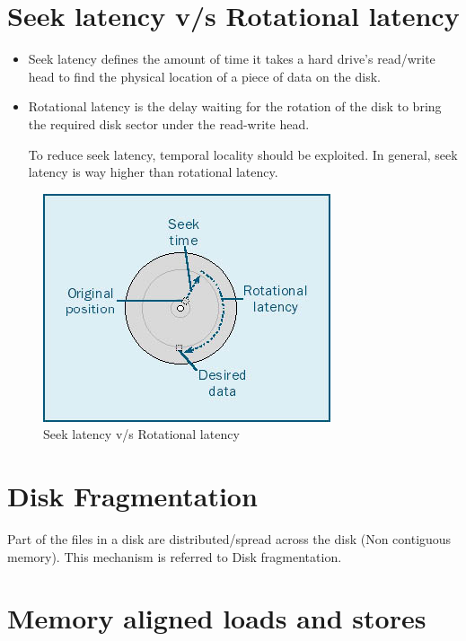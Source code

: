 \documentclass[twoside]{article}
\begin{document}
\section{Seek latency v/s Rotational latency}

\begin{itemize}
\item Seek latency defines the amount of time it takes a hard drive’s  read/write head to find the physical location of a piece of data on the  disk. 

\item Rotational latency is the delay waiting for the rotation of the disk to bring the required disk sector under the read-write head.

To reduce seek latency, temporal locality should be exploited. In general, seek latency is way higher than rotational latency.

\end{itemize}
\begin{figure}[ht]
  \centering
  \includegraphics[width=0.7\linewidth]{seek_latency.jpg}
  \caption{Seek latency v/s Rotational latency}
  \vspace{-0.2cm}
  \label{fig:seek/rotational}
  \vspace{-0.2cm}
\end{figure}

\section{Disk Fragmentation}

Part of the files in a disk are distributed/spread across the disk (Non contiguous memory). This mechanism is referred to Disk fragmentation.

\section{Memory aligned loads and stores}
\end{document}
